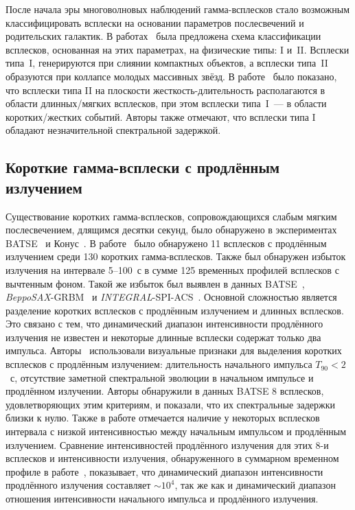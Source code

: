 После начала эры многоволновых наблюдений гамма-всплесков стало возможным 
классифицировать всплески на основании параметров послесвечений и родительских галактик. 
В работах~\citep{Zhang_2006, Zhang_2007, Zhang_2009} была предложена схема классификации всплесков, 
основанная на этих параметрах, на физические типы: I и~II. Всплески типа~I, 
генерируются при слиянии компактных объектов, а всплески типа~II образуются 
при коллапсе молодых массивных звёзд. В работе~\citep{Zhang_2009} было показано, 
что всплески типа II на плоскости жесткость-длительность располагаются в области 
длинных/мягких всплесков, при этом всплески типа~I~--- в области коротких/жестких событий. 
Авторы также отмечают, что всплески типа I обладают незначительной спектральной задержкой.

\subsection{Короткие гамма-всплески с продлённым излучением}
Существование коротких гамма-всплесков, сопровождающихся слабым мягким послесвечением, 
длящимся десятки секунд, было обнаружено в экспериментах BATSE~\citep{Burenin_2000AstL} и 
Конус~\citep{Mazets_2002astro_ph}. В работе~\cite{Frederiks_2004ASPC} 
было обнаружено 11 всплесков с продлённым излучением среди 130 коротких гамма-всплесков. 
Также был обнаружен избыток излучения на интервале 5--100~с в сумме 125 временных 
профилей всплесков с вычтенным фоном. Такой же избыток был выявлен в данных 
BATSE~\citep{Lazzati_2001AandA, Connaughton_2002ApJ}, \textit{BeppoSAX}-GRBM~\citep{Montanari_2005ApJ} и 
\textit{INTEGRAL}-SPI-ACS~\citep{Minaev_2010AstL}. 
Основной сложностью является разделение коротких всплесков с продлённым излучением 
и длинных всплесков. Это связано с тем, что динамический диапазон интенсивности 
продлённого излучения не известен и некоторые длинные всплески содержат только 
два импульса. Авторы~\citep{Norris_and_Bonnel_2006} использовали визуальные признаки 
для выделения коротких всплесков с продлённым излучением: длительность начального 
импульса $T_{90}<2$~с, отсутствие заметной спектральной эволюции в начальном 
импульсе и продлённом излучении. Авторы обнаружили в данных BATSE 8 всплесков, 
удовлетворяющих этим критериям, и показали, что их спектральные задержки близки к нулю. 
Также в работе отмечается наличие у некоторых всплесков интервала с низкой интенсивностью 
между начальным импульсом и продлённым излучением. Сравнение интенсивностей продлённого 
излучения для этих 8-и всплесков и интенсивности излучения, обнаруженного в 
суммарном временном профиле в работе~\citep{Lazzati_2001AandA}, показывает, 
что динамический диапазон интенсивности продлённого излучения составляет $\sim 10^4$, 
так же как и динамический диапазон отношения интенсивности начального импульса и продлённого излучения.

